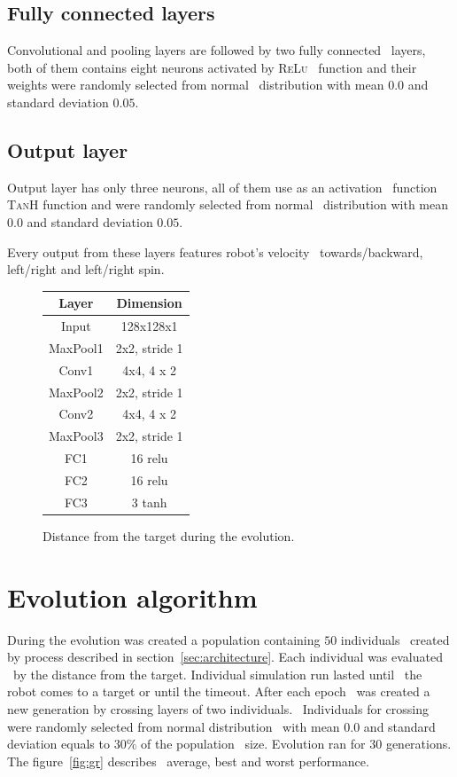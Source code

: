 \documentclass[twocolumn,10pt]{asme2ej}
\begin{document}
\subsection{Fully connected layers}
Convolutional and pooling layers are followed by two fully connected \
layers, both of them contains eight neurons activated by \textsc{ReLu} \
function and their weights were randomly selected from normal \
distribution with mean $0.0$ and standard deviation $0.05$.

\subsection{Output layer}
Output layer has only three neurons, all of them use as an activation \
function \textsc{TanH} function and were randomly selected from normal \
distribution with mean $0.0$ and standard deviation $0.05$.\
\par Every output from these layers features robot's velocity \
towards/backward, left/right and left/right spin.

\begin{figure}[ht]
\begin{center}
    \begin{tabular}{ |c|c| } 
     \hline
     Layer & Dimension \\ 
     \hline
     \hline  
     Input & 128x128x1 \\ 
     \hline
     MaxPool1 & 2x2, stride 1 \\ 
     \hline
     Conv1 & 4x4, 4 x 2 \\
     \hline
     MaxPool2 & 2x2, stride 1 \\ 
     \hline
     Conv2 & 4x4, 4 x 2 \\ 
     \hline
     MaxPool3 & 2x2, stride 1 \\
     \hline
     FC1 & 16 relu \\
     \hline
     FC2 & 16 relu \\
     \hline
     FC3 & 3 tanh \\
     \hline
    \end{tabular}
    \end{center}
    \caption{Distance from the target during the evolution.}
    \label{fig:tbl}
\end{figure}

\section{Evolution algorithm}
During the evolution was created a population containing $50$ individuals \
created by process described in section~\ref{sec:architecture}. Each individual was evaluated \
by the distance from the target. Individual simulation run lasted until \
the robot comes to a target or until the timeout. After each epoch \
was created a new generation by crossing layers of two individuals. \
Individuals for crossing were randomly selected from normal distribution \
with mean $0.0$ and standard deviation equals to $30\%$ of the population \
size. Evolution ran for $30$ generations. The figure~\ref{fig:gr} describes \
average, best and worst performance.
\end{document}
